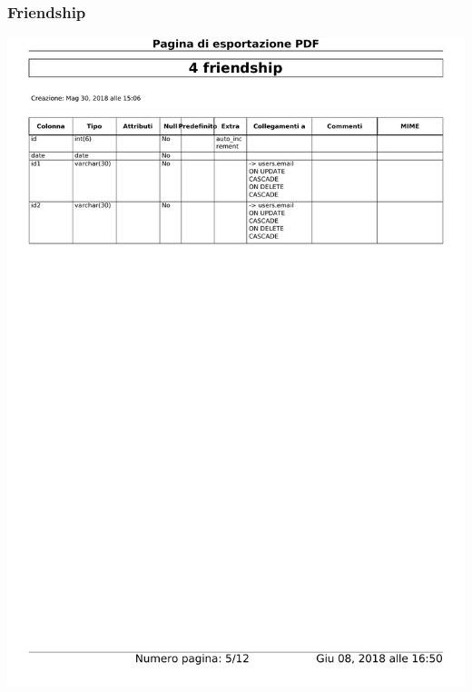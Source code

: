 \documentclass{article}
\begin{document}
    \subsubsection{Friendship}
    \begin{center}
        \includegraphics[width=15cm]{images/friendship}
    \end{center}
\end{document}
